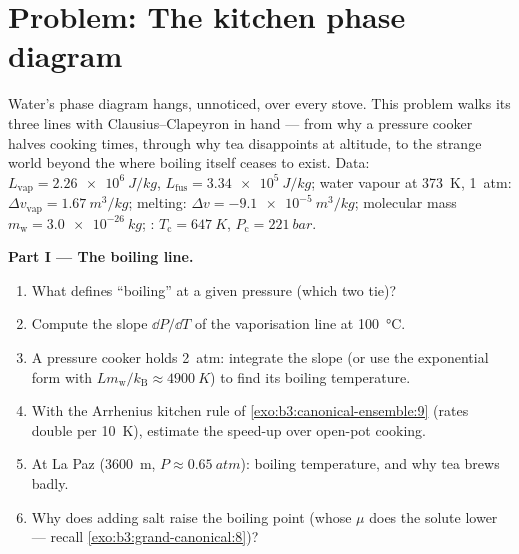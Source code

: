 \section{Problem: The kitchen phase diagram}

\begin{problem}\label{pb:b3:phase-transitions:1}
Water's phase diagram hangs, unnoticed, over every stove. This
problem walks its three lines with Clausius--Clapeyron in hand ---
from why a pressure cooker halves cooking times, through why tea
disappoints at altitude, to the strange world beyond the  where boiling itself ceases to exist. Data: $L_{\text{vap}}
= \qty{2.26e6}{J/kg}$, $L_{\text{fus}} = \qty{3.34e5}{J/kg}$;
water vapour at \qty{373}{K}, \qty{1}{atm}: $\Delta v_{\text{vap}}
= \qty{1.67}{m^3/kg}$; melting: $\Delta v = \qty{-9.1e-5}{m^3/kg}$;
molecular mass $m_{\text{w}} = \qty{3.0e-26}{kg}$; :
$T_{\text{c}} = \qty{647}{K}$, $P_{\text{c}} = \qty{221}{bar}$.

\medskip\noindent\textbf{Part I --- The boiling line.}
\begin{enumerate}
  \item What defines ``boiling'' at a given pressure (which two
         tie)?
  \item Compute the slope $\dd P/\dd T$ of the vaporisation line
        at \qty{100}{\celsius}.
  \item A pressure cooker holds \qty{2}{atm}: integrate the slope
        (or use the exponential form with $Lm_{\text{w}}/
        k_{\text{B}} \approx \qty{4900}{K}$) to find its boiling
        temperature.
  \item With the Arrhenius kitchen rule of
        \cref{exo:b3:canonical-ensemble:9} (rates double per
        \qty{10}{K}), estimate the speed-up over open-pot
        cooking.
  \item At La Paz (\qty{3600}{m}, $P \approx \qty{0.65}{atm}$):
        boiling temperature, and why tea brews badly.
  \item Why does adding salt raise the boiling point (whose $\mu$
        does the solute lower --- recall
        \cref{exo:b3:grand-canonical:8})?
\end{enumerate}


\end{problem}
